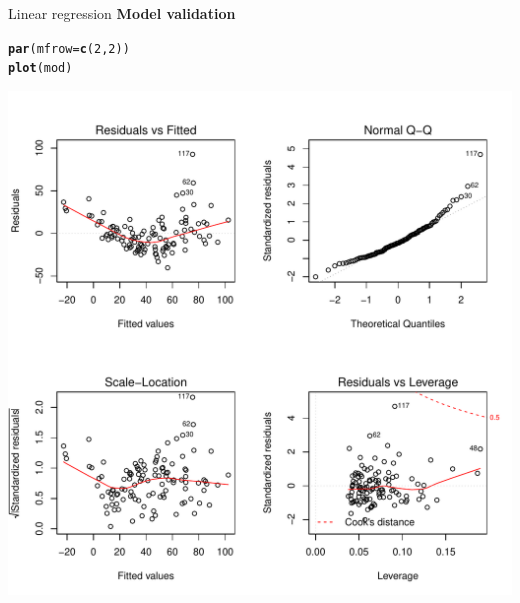 \documentclass[10pt,xcolor=dvipsnames]{beamer}\usepackage[]{graphicx}\usepackage[]{color}
\makeatletter
\def\maxwidth{ %
  \ifdim\Gin@nat@width>\linewidth
    \linewidth
  \else
    \Gin@nat@width
  \fi
}
\newcommand{\hlnum}[1]{\textcolor[rgb]{0.686,0.059,0.569}{#1}}%
\newcommand{\hlstd}[1]{\textcolor[rgb]{0.345,0.345,0.345}{#1}}%
\newcommand{\hlkwc}[1]{\textcolor[rgb]{0.333,0.667,0.333}{#1}}%
\newcommand{\hlkwd}[1]{\textcolor[rgb]{0.737,0.353,0.396}{\textbf{#1}}}%
\newenvironment{kframe}{%
 \def\at@end@of@kframe{}%
 \ifinner\ifhmode%
  \def\at@end@of@kframe{\end{minipage}}%
  \begin{minipage}{\columnwidth}%
 \fi\fi%
 \def\FrameCommand##1{\hskip\@totalleftmargin \hskip-\fboxsep
 \colorbox{shadecolor}{##1}\hskip-\fboxsep
     \hskip-\linewidth \hskip-\@totalleftmargin \hskip\columnwidth}%
 \MakeFramed {\advance\hsize-\width
   \@totalleftmargin\z@ \linewidth\hsize
   \@setminipage}}%
 {\par\unskip\endMakeFramed%
 \at@end@of@kframe}
\newenvironment{knitrout}{}{} %
\makeatother
\begin{document}
\begin{frame}[fragile]{Linear regression}
\textbf{Model validation}
\begin{knitrout}
\color{fgcolor}\begin{kframe}
\begin{alltt}
\hlkwd{par}\hlstd{(}\hlkwc{mfrow}\hlstd{=}\hlkwd{c}\hlstd{(}\hlnum{2}\hlstd{,}\hlnum{2}\hlstd{))}
\hlkwd{plot}\hlstd{(mod)}
\end{alltt}
\end{kframe}
\includegraphics[width=\maxwidth]{figure/lmModVal-1} 

\end{knitrout}
\end{frame}
\end{document}
